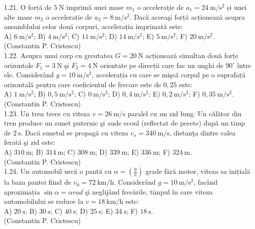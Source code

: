 \documentclass[10pt]{article}
\begin{document}
1.21. O forță de $5 \mathrm{~N}$ imprimă unei mase $m_{1}$ o accelerație de $a_{1}=24 \mathrm{~m} / \mathrm{s}^{2}$ și unei alte mase $m_{2}$ o accelerație de $a_{2}=8 \mathrm{~m} / \mathrm{s}^{2}$. Dacă aceeaşi forță acționează asupra ansamblului celor două corpuri, accelerația imprimată este:\\ A) $6 \mathrm{~m} / \mathrm{s}^{2}$; B) $4 \mathrm{~m} / \mathrm{s}^{2}$; C) $11 \mathrm{~m} / \mathrm{s}^{2}$; D) $14 \mathrm{~m} / \mathrm{s}^{2}$; E) $5 \mathrm{~m} / \mathrm{s}^{2}$; F) $20 \mathrm{~m} / \mathrm{s}^{2}$.\\ (Constantin P. Cristescu)\\

1.22. Asupra unui corp cu greutatea $G=20 \mathrm{~N}$ acționează simultan două forțe orizontale $F_{1}=3 \mathrm{~N}$ şi $F_{2}=4 \mathrm{~N}$ orientate pe direcții care fac un unghi de $90^{\circ}$ între ele. Considerând $g=10 \mathrm{~m} / \mathrm{s}^{2}$, accelerația cu care se mişcă corpul pe o suprafață orizontală pentru care coeficientul de frecare este de $0,25$ este:\\ A) $1 \mathrm{~m} / \mathrm{s}^{2}$; B) $0,5 \mathrm{~m} / \mathrm{s}^{2}$; C) $0 \mathrm{~m} / \mathrm{s}^{2}$; D) $0,4 \mathrm{~m} / \mathrm{s}^{2}$; E) $0,2 \mathrm{~m} / \mathrm{s}^{2}$; F) $0,35 \mathrm{~m} / \mathrm{s}^{2}$.\\ (Constantin P. Cristescu)\\

1.23. Un tren trece cu viteza $v=26 \mathrm{~m} / \mathrm{s}$ paralel cu un zid lung. Un călător din tren produce un sunet puternic şi aude ecoul (reflectat de perete) după un timp de $2 \mathrm{~s}$. Dacă sunetul se propagă cu viteza $v_{s}=340 \mathrm{~m} / \mathrm{s}$, distanţa dintre calea ferată şi zid este:\\ A) $310 \mathrm{~m}$; B) $314 \mathrm{~m}$; C) $308 \mathrm{~m}$; D) $339 \mathrm{~m}$; E) $336 \mathrm{~m}$; F) $324 \mathrm{~m}$.\\ (Constantin P. Cristescu)\\

1.24. Un automobil urcă o pantă cu $\alpha=\left(\frac{9}{\pi}\right)$ grade fără motor, viteza sa inițială la baza pantei fiind de $v_{0}=72 \mathrm{~km} / \mathrm{h}$. Considerând $g=10 \mathrm{~m} / \mathrm{s}^{2}$, facând aproximația $\sin \alpha=\alpha rad$ şi neglijând frecările, timpul în care viteza automobilului se reduce la $v=18 \mathrm{~km} / \mathrm{h}$ este:\\ A) $20 \mathrm{~s}$; B) $30 \mathrm{~s}$; C) $40 \mathrm{~s}$; D) $25 \mathrm{~s}$; E) $34 \mathrm{~s}$; F) $18 \mathrm{~s}$.\\ (Constantin P. Cristescu)\\
\end{document}
